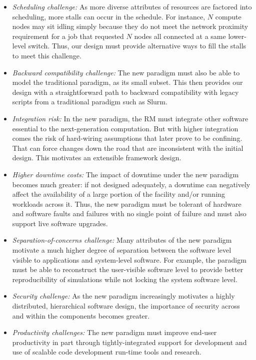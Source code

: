 \documentclass[10pt]{article}
\newcommand{\slurm}{Slurm}
\begin{document}
\begin{itemize}
\item{\sl Scheduling challenge:} As more diverse attributes of resources
      are factored into scheduling, more stalls can occur in the schedule.
      For instance, $N$ compute nodes may sit idling simply because they do not meet
      the network proximity requirement for a job that requested 
      $N$ nodes all connected at a same lower-level switch. Thus, our design 
      must provide alternative ways to fill the stalls to meet this 
      challenge.

\item{\sl Backward compatibility challenge:} The new paradigm must also be
      able to model the traditional paradigm, as its small subset. This
      then provides our design with a straightforward path to 
      backward compatibility with legacy scripts from a traditional 
      paradigm such as \slurm.

\item{\sl Integration risk:} In the new paradigm, the RM must 
     integrate other software essential to the next-generation computation. 
     But with higher integration comes the risk of hard-wiring assumptions
     that later prove to be confining. That can force changes down the road
     that are inconsistent with the initial design. This motivates
     an extensible framework design. 
     
\item{\sl Higher downtime costs:} The impact of downtime under the 
     new paradigm becomes much greater: if not designed adequately, 
     a downtime can negatively affect the availability of
     a large portion of the facility and/or running workloads across it.
     Thus, the new paradigm must be tolerant of hardware and software faults 
     and failures with no single point of failure and must also support 
     live software upgrades.

\item{\sl Separation-of-concerns challenge:} Many attributes of the new
     paradigm motivate a much higher degree of separation between
     the software level visible to applications and system-level 
     software. For example, the paradigm must be able to reconstruct the user-visible
     software level to provide better reproducibility of simulations while not
     locking the system software level. 
   
\item{\sl Security challenge:} As the new paradigm increasingly motivates
     a highly distributed, hierarchical software design, 
     the importance of security across and within the components becomes greater.

\item{\sl Productivity challenges:} The new paradigm must improve end-user 
     productivity in part through tightly-integrated support for development
     and use of scalable code development run-time tools and research.

\end{itemize}
\end{document}
